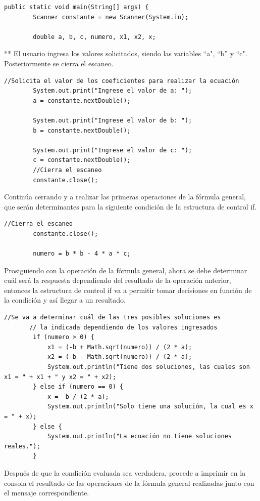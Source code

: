 \begin{lstlisting}[style=javaStyle]
public static void main(String[] args) {
        Scanner constante = new Scanner(System.in);

        double a, b, c, numero, x1, x2, x;
\end{lstlisting}
**
El usuario ingresa los valores solicitados, siendo las variables ``a", ``b'' y ``c". Posteriormente se cierra el escaneo.

\begin{lstlisting}[style=javaStyle]
//Solicita el valor de los coeficientes para realizar la ecuación
        System.out.print("Ingrese el valor de a: ");
        a = constante.nextDouble();
        
        System.out.print("Ingrese el valor de b: ");
        b = constante.nextDouble();
        
        System.out.print("Ingrese el valor de c: ");
        c = constante.nextDouble();
        //Cierra el escaneo
        constante.close();

\end{lstlisting}

Continúa cerrando  y a realizar las primeras operaciones de la fórmula general, que serán determinantes para la siguiente condición de la estructura de control if.

\begin{lstlisting}[style=javaStyle]
        //Cierra el escaneo
        constante.close();
        
        numero = b * b - 4 * a * c;
\end{lstlisting}
Prosiguiendo con la operación de la fórmula general, ahora se debe determinar cuál será la respuesta dependiendo del resultado de la operación anterior, entonces la estructura de control if va a permitir tomar decisiones en función de la condición y así llegar a un resultado.

\begin{lstlisting}[style=javaStyle]
   //Se va a determinar cuál de las tres posibles soluciones es 
       // la indicada dependiendo de los valores ingresados
        if (numero > 0) {
            x1 = (-b + Math.sqrt(numero)) / (2 * a);
            x2 = (-b - Math.sqrt(numero)) / (2 * a);
            System.out.println("Tiene dos soluciones, las cuales son x1 = " + x1 + " y x2 = " + x2);
        } else if (numero == 0) {
            x = -b / (2 * a);
            System.out.println("Solo tiene una solución, la cual es x = " + x);
        } else {
            System.out.println("La ecuación no tiene soluciones reales.");
        }
\end{lstlisting}
 Después de que la condición evaluada sea verdadera, procede a imprimir en la consola el resultado de las operaciones de la fórmula general realizadas junto con el mensaje correspondiente.

